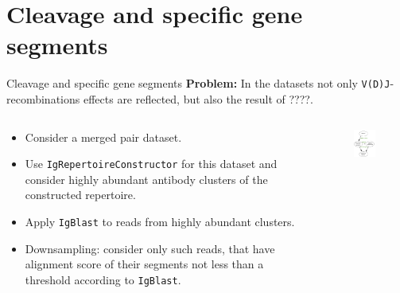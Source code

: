 \documentclass{beamer}\usepackage[]{graphicx}\usepackage[]{color}
\begin{document}
\section{Cleavage and specific gene segments}
\begin{frame}{Cleavage and specific gene segments}
  \textbf{Problem:} In the datasets not only \texttt{V(D)J}-recombinations effects are reflected, but also the result of ????.
 
  \pause
  \bigskip 
  \small{
  \begin{columns}[T]
    \begin{column}{0.6\textwidth}
      \begin{itemize}
        \item Consider a merged pair dataset.
        \item Use \texttt{IgRepertoireConstructor} for this dataset and consider {\color{blue} highly abundant antibody clusters} of the constructed repertoire.
        \item Apply \texttt{IgBlast} to reads from highly abundant clusters.
        \item {\color{blue} Downsampling}: consider only such reads, that have alignment score of their segments not less than a {\color{blue} threshold} according to \texttt{IgBlast}.
      \end{itemize}
    \end{column}
    \begin{column}{0.5\textwidth}
      \begin{figure}[h]
        \includegraphics[width=120pt]{Pictures/downsampling.pdf}
      \end{figure}
    \end{column}
  \end{columns}
  }
\end{frame}
\end{document}
